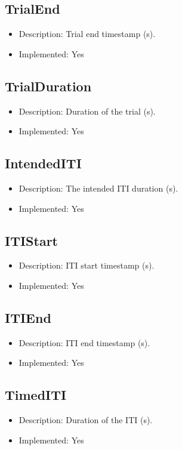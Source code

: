 \subsection*{TrialEnd}
\begin{itemize}
	\item Description: Trial end timestamp (s).
	\item Implemented: Yes
\end{itemize}

\subsection*{TrialDuration}
\begin{itemize}
	\item Description: Duration of the trial (s).
	\item Implemented: Yes
\end{itemize}

\subsection*{IntendedITI}
\begin{itemize}
	\item Description: The intended ITI duration (s).
	\item Implemented: Yes
\end{itemize}

\subsection*{ITIStart}
\begin{itemize}
	\item Description: ITI start timestamp (s).
	\item Implemented: Yes
\end{itemize}

\subsection*{ITIEnd}
\begin{itemize}
	\item Description: ITI end timestamp (s).
	\item Implemented: Yes
\end{itemize}

\subsection*{TimedITI}
\begin{itemize}
	\item Description: Duration of the ITI (s).
	\item Implemented: Yes
\end{itemize}


